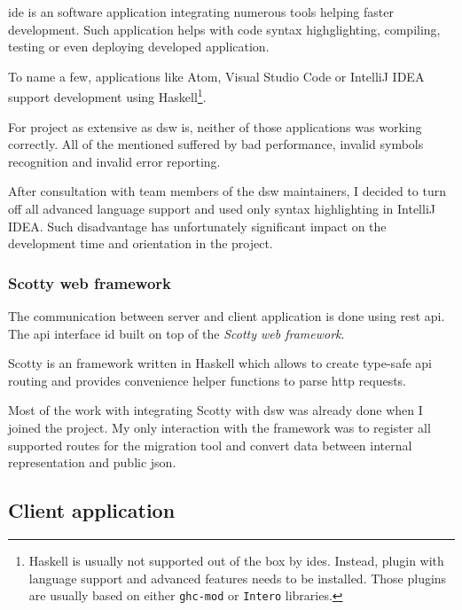 \gls{ide} is an software application integrating numerous tools helping faster development\cite{ssq-ide}.
Such application helps with code syntax highglighting, compiling, testing or even deploying developed application.

To name a few, applications like Atom, Visual Studio Code or IntelliJ IDEA support development using Haskell\footnote{Haskell is usually not supported out of the box by \gls{ide}s. Instead, plugin with language support and advanced features needs to be installed. Those plugins are usually based on either \texttt{ghc-mod} or \texttt{Intero} libraries.}.

For project as extensive as \gls{dsw} is, neither of those applications was working correctly.
All of the mentioned suffered by bad performance, invalid symbols recognition and invalid error reporting.

After consultation with team members of the \gls{dsw} maintainers, I decided to turn off all advanced language support and used only syntax highlighting in IntelliJ IDEA.
Such disadvantage has unfortunately significant impact on the development time and orientation in the project.

\subsubsection*{Scotty web framework}

The communication between server and client application is done using \gls{rest} \gls{api}.
The \gls{api} interface id built on top of the \textit{Scotty web framework}.

Scotty is an framework written in Haskell which allows to create type-safe \gls{api} routing and provides convenience helper functions to parse \gls{http} requests.

Most of the work with integrating Scotty with \gls{dsw} was already done when I joined the project.
My only interaction with the framework was to register all supported routes for the migration tool and convert data between internal representation and public \gls{json}.

\subsection{Client application}
